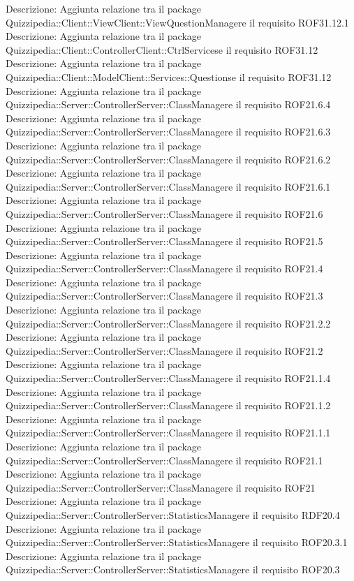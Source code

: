Descrizione: Aggiunta relazione tra il package Quizzipedia::Client::ViewClient::ViewQuestionManagere il requisito ROF31.12.1 
Descrizione: Aggiunta relazione tra il package Quizzipedia::Client::ControllerClient::CtrlServicese il requisito ROF31.12 
Descrizione: Aggiunta relazione tra il package Quizzipedia::Client::ModelClient::Services::Questionse il requisito ROF31.12 
Descrizione: Aggiunta relazione tra il package Quizzipedia::Server::ControllerServer::ClassManagere il requisito ROF21.6.4 
Descrizione: Aggiunta relazione tra il package Quizzipedia::Server::ControllerServer::ClassManagere il requisito ROF21.6.3 
Descrizione: Aggiunta relazione tra il package Quizzipedia::Server::ControllerServer::ClassManagere il requisito ROF21.6.2 
Descrizione: Aggiunta relazione tra il package Quizzipedia::Server::ControllerServer::ClassManagere il requisito ROF21.6.1 
Descrizione: Aggiunta relazione tra il package Quizzipedia::Server::ControllerServer::ClassManagere il requisito ROF21.6 
Descrizione: Aggiunta relazione tra il package Quizzipedia::Server::ControllerServer::ClassManagere il requisito ROF21.5 
Descrizione: Aggiunta relazione tra il package Quizzipedia::Server::ControllerServer::ClassManagere il requisito ROF21.4 
Descrizione: Aggiunta relazione tra il package Quizzipedia::Server::ControllerServer::ClassManagere il requisito ROF21.3 
Descrizione: Aggiunta relazione tra il package Quizzipedia::Server::ControllerServer::ClassManagere il requisito ROF21.2.2 
Descrizione: Aggiunta relazione tra il package Quizzipedia::Server::ControllerServer::ClassManagere il requisito ROF21.2 
Descrizione: Aggiunta relazione tra il package Quizzipedia::Server::ControllerServer::ClassManagere il requisito ROF21.1.4 
Descrizione: Aggiunta relazione tra il package Quizzipedia::Server::ControllerServer::ClassManagere il requisito ROF21.1.2 
Descrizione: Aggiunta relazione tra il package Quizzipedia::Server::ControllerServer::ClassManagere il requisito ROF21.1.1 
Descrizione: Aggiunta relazione tra il package Quizzipedia::Server::ControllerServer::ClassManagere il requisito ROF21.1 
Descrizione: Aggiunta relazione tra il package Quizzipedia::Server::ControllerServer::ClassManagere il requisito ROF21 
Descrizione: Aggiunta relazione tra il package Quizzipedia::Server::ControllerServer::StatisticsManagere il requisito RDF20.4 
Descrizione: Aggiunta relazione tra il package Quizzipedia::Server::ControllerServer::StatisticsManagere il requisito ROF20.3.1 
Descrizione: Aggiunta relazione tra il package Quizzipedia::Server::ControllerServer::StatisticsManagere il requisito ROF20.3 
